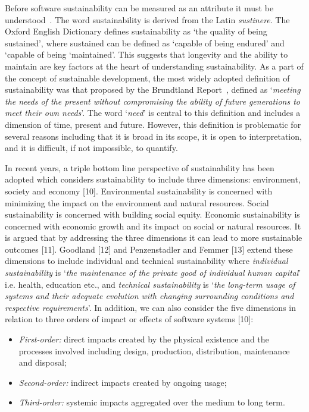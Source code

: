 \documentclass[preprint,12pt,authoryear]{elsarticle}
\begin{document}
Before software sustainability can be measured as an attribute it must
be understood~\citep{seacord-et-al:2003}. The word sustainability is
derived from the Latin {\emph{sustinere}}. The Oxford English
Dictionary defines sustainability as ‘the quality of being sustained’,
where sustained can be defined as ‘capable of being endured’ and
‘capable of being ‘maintained’. This suggests that longevity and the
ability to maintain are key factors at the heart of understanding
sustainability.  As a part of the concept of sustainable development,
the most widely adopted definition of sustainability was that proposed
by the Brundtland Report~\citep{brundtlandreport:1987}, defined as
`{\emph{meeting the needs of the present without compromising the
ability of future generations to meet their own needs}}'. The word
`{\emph{need}}' is central to this definition and includes a dimension
of time, present and future. However, this definition is problematic
for several reasons including that it is broad in its scope, it is
open to interpretation, and it is difficult, if not impossible, to
quantify.

In recent years, a triple bottom line perspective of sustainability
has been adopted which considers sustainability to include three
dimensions: environment, society and economy [10]. Environmental
sustainability is concerned with minimizing the impact on the
environment and natural resources. Social sustainability is concerned
with building social equity. Economic sustainability is concerned with
economic growth and its impact on social or natural resources. It is
argued that by addressing the three dimensions it can lead to more
sustainable outcomes [11]. Goodland [12] and Penzenstadler and Femmer
[13] extend these dimensions to include individual and technical
sustainability where {\emph{individual sustainability}} is `{\emph{the
maintenance of the private good of individual human capital}}'
i.e. health, education etc., and {\emph{technical sustainability}} is
`{\emph{the long-term usage of systems and their adequate evolution
with changing surrounding conditions and respective
requirements}}'. In addition, we can also consider the five dimensions
in relation to three orders of impact or effects of software systems
[10]:

\begin{itemize}
\item {\emph{First-order:}} direct impacts created by the physical
existence and the processes involved including design, production,
distribution, maintenance and disposal;
\item {\emph{Second-order:}} indirect impacts created by ongoing
usage;
\item {\emph{Third-order:}} systemic impacts aggregated over the
medium to long term.
\end{itemize}
\end{document}

